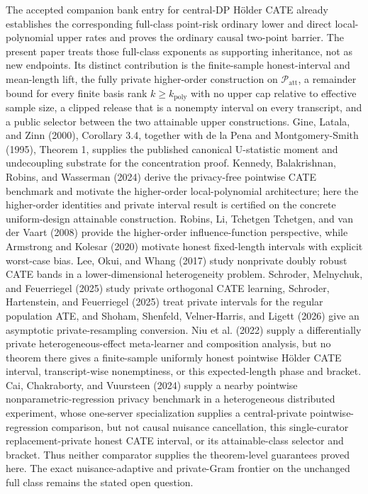 \documentclass{article}
\begin{document}
The accepted companion bank entry for central-DP H\"older CATE already establishes the corresponding full-class point-risk ordinary lower and direct local-polynomial upper rates and proves the ordinary causal two-point barrier.  The present paper treats those full-class exponents as supporting inheritance, not as new endpoints.  Its distinct contribution is the finite-sample honest-interval and mean-length lift, the fully private higher-order construction on \(\mathcal P_{\mathrm{att}}\), a remainder bound for every finite basis rank \(k\ge k_{\mathrm{poly}}\) with no upper cap relative to effective sample size, a clipped release that is a nonempty interval on every transcript, and a public selector between the two attainable upper constructions.  Gine, Latala, and Zinn (2000), Corollary 3.4, together with de la Pena and Montgomery-Smith (1995), Theorem 1, supplies the published canonical U-statistic moment and undecoupling substrate for the concentration proof.  Kennedy, Balakrishnan, Robins, and Wasserman (2024) derive the privacy-free pointwise CATE benchmark and motivate the higher-order local-polynomial architecture; here the higher-order identities and private interval result is certified on the concrete uniform-design attainable construction.  Robins, Li, Tchetgen Tchetgen, and van der Vaart (2008) provide the higher-order influence-function perspective, while Armstrong and Kolesar (2020) motivate honest fixed-length intervals with explicit worst-case bias.  Lee, Okui, and Whang (2017) study nonprivate doubly robust CATE bands in a lower-dimensional heterogeneity problem.  Schroder, Melnychuk, and Feuerriegel (2025) study private orthogonal CATE learning, Schroder, Hartenstein, and Feuerriegel (2025) treat private intervals for the regular population ATE, and Shoham, Shenfeld, Velner-Harris, and Ligett (2026) give an asymptotic private-resampling conversion.  Niu et al. (2022) supply a differentially private heterogeneous-effect meta-learner and composition analysis, but no theorem there gives a finite-sample uniformly honest pointwise H\"older CATE interval, transcript-wise nonemptiness, or this expected-length phase and bracket.  Cai, Chakraborty, and Vuursteen (2024) supply a nearby pointwise nonparametric-regression privacy benchmark in a heterogeneous distributed experiment, whose one-server specialization supplies a central-private pointwise-regression comparison, but not causal nuisance cancellation, this single-curator replacement-private honest CATE interval, or its attainable-class selector and bracket.  Thus neither comparator supplies the theorem-level guarantees proved here.  The exact nuisance-adaptive and private-Gram frontier on the unchanged full class remains the stated open question.
\end{document}
